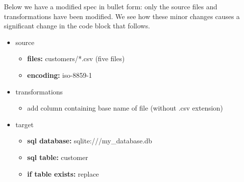Below we have a modified spec in bullet form: only the source files and
transformations have been modified. We see how these minor changes
causes a significant change in the code block that follows.

\begin{itemize}
\tightlist
\item
  source

  \begin{itemize}
  \tightlist
  \item
    \textbf{files:} customers/*.csv (five files)
  \item
    \textbf{encoding:} iso-8859-1
  \end{itemize}
\item
  transformations

  \begin{itemize}
  \tightlist
  \item
    add column containing base name of file (without .csv extension)
  \end{itemize}
\item
  target

  \begin{itemize}
  \tightlist
  \item
    \textbf{sql database:} sqlite:///my\_database.db
  \item
    \textbf{sql table:} customer
  \item
    \textbf{if table exists:} replace
  \end{itemize}
\end{itemize}

